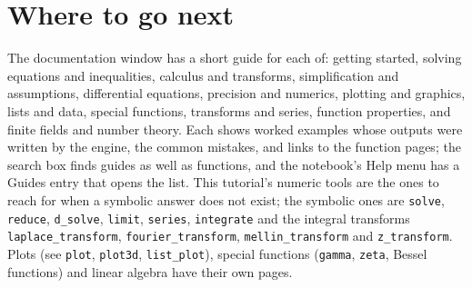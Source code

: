 \documentclass[11pt,a4paper]{article}
\newcommand{\code}[1]{\texttt{#1}}
\begin{document}
\section{Where to go next}

The documentation window has a short guide for each of: getting started, solving equations and inequalities, calculus and transforms, simplification and assumptions, differential equations, precision and numerics, plotting and graphics, lists and data, special functions, transforms and series, function properties, and finite fields and number theory. Each shows worked examples whose outputs were written by the engine, the common mistakes, and links to the function pages; the search box finds guides as well as functions, and the notebook's Help menu has a Guides entry that opens the list. This tutorial's numeric tools are the ones to reach for when a symbolic answer does not exist; the symbolic ones are \code{solve}, \code{reduce}, \code{d\_solve}, \code{limit}, \code{series}, \code{integrate} and the integral transforms \code{laplace\_transform}, \code{fourier\_transform}, \code{mellin\_transform} and \code{z\_transform}. Plots (see \code{plot}, \code{plot3d}, \code{list\_plot}), special functions (\code{gamma}, \code{zeta}, Bessel functions) and linear algebra have their own pages.
\end{document}

